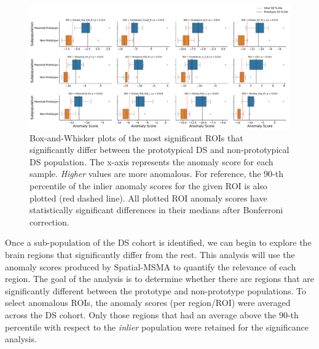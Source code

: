 \begin{figure}[tbhp]
\centering
\includegraphics[width=\textwidth]{figures/roi_boxplot.pdf}
\caption{Box-and-Whisker plots of the most significant ROIs that significantly differ between the prototypical DS and non-prototypical DS population. The x-axis represents the anomaly score for each sample. \textit{Higher} values are more anomalous. For reference, the 90-th percentile of the inlier anomaly scores for the given ROI is also plotted (red dashed line). All plotted ROI anomaly scores have statistically significant differences in their medians after Bonferroni correction. }
\label{fig:roi-box-ds}
\end{figure}


Once a sub-population of the DS cohort is identified, we can begin to explore the brain regions that significantly differ from the rest.  This analysis will use the anomaly scores produced by Spatial-MSMA to quantify the relevance of each region. The goal of the analysis is to determine whether there are regions that are significantly different between the prototype and non-prototype populations. To select anomalous ROIs, the anomaly scores (per region/ROI) were averaged across the DS cohort. Only those regions that had an average above the 90-th percentile with respect to the \textit{inlier} population were retained for the significance analysis.

